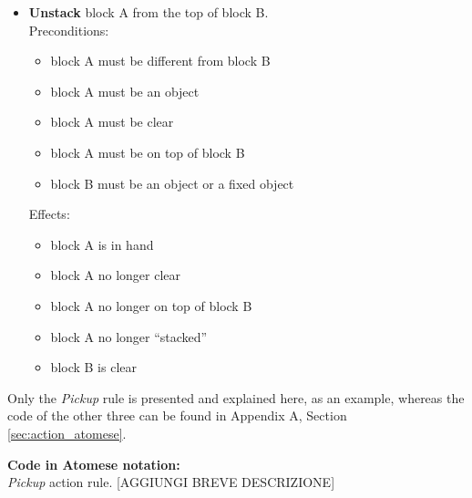 \begin{itemize}
	\item \textbf{Unstack} block A from the top of block B. \\
Preconditions:
	\begin{itemize}
		\item block A must be different from block B
		\item block A must be an object
		\item block A must be clear
		\item block A must be on top of block B
		\item block B must be an object or a fixed object
	\end{itemize}
Effects:
	\begin{itemize}
		\item block A is in hand
		\item block A no longer clear
		\item block A no longer on top of block B
		\item block A no longer \enquote{stacked}
		\item block B is clear
	\end{itemize}
\end{itemize}

Only the \textit{Pickup} rule is presented and explained here, as an example, whereas the code of the other three can be found in Appendix A, Section \ref{sec:action_atomese}. \bigskip \\
\begin{footnotesize}
\textbf{Code in Atomese notation:} \\
\textit{Pickup} action rule. [AGGIUNGI BREVE DESCRIZIONE]
\end{footnotesize}

